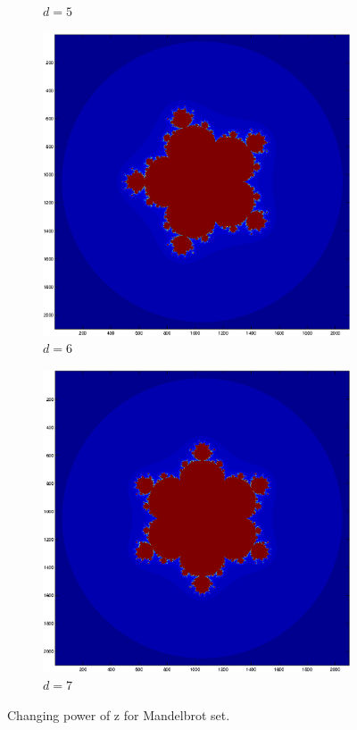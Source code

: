 \documentclass[a4wide, 10pt]{article}
\begin{document}
\begin{figure}[H]
\begin{subfigure}[b]{0.18\textwidth}
                \caption{$d = 5$}
        \end{subfigure}  
        \begin{subfigure}[b]{0.18\textwidth}
                \includegraphics[width=\textwidth]{EPSFiles/Mandelbrot_Power_6}
                \caption{$d = 6$}
        \end{subfigure} 
        \begin{subfigure}[b]{0.18\textwidth}
                \includegraphics[width=\textwidth]{EPSFiles/Mandelbrot_Power_7}
                \caption{$d = 7$}
        \end{subfigure} 
        \caption{Changing power of z for Mandelbrot set.}
\end{figure}
\end{document}
